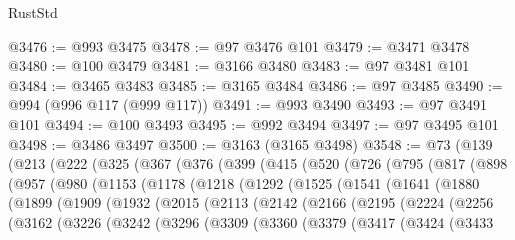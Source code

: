 \begin{lexlean}{RustStd}
\begin{coremodule}
@3476 := @993 @3475
@3478 := @97 @3476 @101
@3479 := @3471 @3478
@3480 := @100 @3479
@3481 := @3166 @3480
@3483 := @97 @3481 @101
@3484 := @3465 @3483
@3485 := @3165 @3484
@3486 := @97 @3485
@3490 := @994 (@996 @117 (@999 @117))
@3491 := @993 @3490
@3493 := @97 @3491 @101
@3494 := @100 @3493
@3495 := @992 @3494
@3497 := @97 @3495 @101
@3498 := @3486 @3497
@3500 := @3163 (@3165 @3498)
@3548 := @73
    (@139
      (@213
        (@222
          (@325
            (@367
              (@376
                (@399
                  (@415
                    (@520
                      (@726
                        (@795
                          (@817
                            (@898
                              (@957
                                (@980
                                  (@1153
                                    (@1178
                                      (@1218
                                        (@1292
                                          (@1525
                                            (@1541
                                              (@1641
                                                (@1880
                                                  (@1899
                                                    (@1909
                                                      (@1932
                                                        (@2015
                                                          (@2113
                                                            (@2142
                                                              (@2166
                                                                (@2195
                                                                  (@2224
                                                                    (@2256
                                                                      (@3162
                                                                        (@3226
                                                                          (@3242
                                                                            (@3296
                                                                              (@3309
                                                                                (@3360
                                                                                  (@3379
                                                                                    (@3417
                                                                                      (@3424
                                                                                        (@3433

\end{coremodule}
\end{lexlean}
